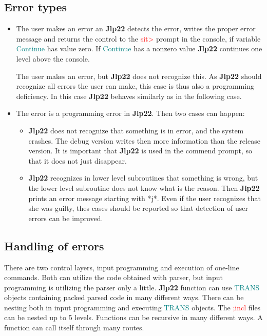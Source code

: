 \subsection{Error types} 
\label{errortype} 
\begin{itemize} 
\item The user makes an error an \textbf{Jlp22} detects the error, writes the proper error message 
and returns the control to the \textcolor{Red}{sit>} prompt in the console, if variable \textcolor{teal}{Continue} has value zero. If \textcolor{teal}{Continue} has a nonzero value 
\textbf{Jlp22} continues one level above the console. 
 
The user makes an error, but \textbf{Jlp22} does not recognize this. As \textbf{Jlp22} should recognize all errors the 
user can make, this case is thus also a programming deficiency. 
In this case \textbf{Jlp22} 
behaves similarly as in the following case. 
 
\item The error is a programming error in \textbf{Jlp22}. Then two cases can happen: 
\begin{itemize} 
\item \textbf{Jlp22} does not recognize that something is in error, and the system crashes. The debug 
version writes then more information than the release version. It is important that \textbf{Jlp22} is 
used in the commend prompt, so that it does not just disappear. 
\item \textbf{Jlp22} recognizes in lower level subroutines that something is wrong, but the 
lower level subroutine does not know what is the reason. Then \textbf{Jlp22} prints an error message 
starting with *j*. Even if the user recognizes that she was guilty, thes cases should be reported 
so that detection of user errors can be improved. 
\end{itemize} 
\end{itemize} 
\subsection{Handling of errors} 
\label{errorhand} 
There are two control layers, input programming and execution of one-line commands. Both can utilize 
the code obtained with parser, but input programming is utilizing the parser only a little. 
\textbf{Jlp22} function can use \textcolor{teal}{TRANS} objects containing packed parsed code in many different ways. 
There can be nesting both in input programming and executing \textcolor{teal}{TRANS} objects. The \textcolor{Red}{;incl} files 
can be nested up to 5 levels. Functions can be recursive in many different ways. A function can call itself 
through many routes. 
 
